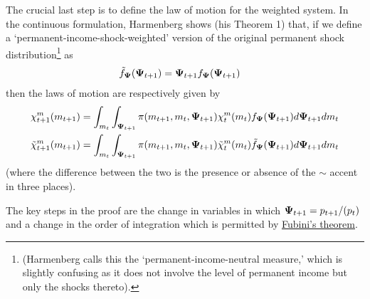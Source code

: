 \documentclass[\econtexRoot/BufferStockTheory]{subfiles}
\begin{document}
The crucial last step is to define the law of motion for the weighted system.  In the continuous formulation, Harmenberg shows (his Theorem 1) that, if we define a `permanent-income-shock-weighted' version of the original permanent shock distribution\footnote{(Harmenberg calls this the `permanent-income-neutral measure,' which is slightly confusing as it does not involve the level of permanent income but only the shocks thereto).} as
\begin{equation}\begin{gathered}\begin{aligned}
  \tilde{f}_{\mathbf{\Psi}}(\mathbf{\Psi}_{t+1}) & = \mathbf{\Psi}_{t+1} f_{\mathbf{\Psi}}(\mathbf{\Psi}_{t+1})
\end{aligned}\end{gathered}\end{equation}
then the laws of motion are respectively given by 
\begin{equation}\begin{aligned}
  {\chi}^{m}_{t+1}(m_{t+1}) & = \int_{m_{t}} \int_{\mathbf{\Psi}_{t+1}} \pi(m_{t+1},m_{t},\mathbf{\Psi}_{t+1}) {\chi}^{m}_{t}(m_{t}) f_{\mathbf{\Psi}}(\mathbf{\Psi}_{t+1}) d \mathbf{\Psi}_{t+1} d m_{t}
  \\
  \tilde{\chi}^{m}_{t+1}(m_{t+1}) & = \int_{m_{t}} \int_{\mathbf{\Psi}_{t+1}} \pi(m_{t+1},m_{t},\mathbf{\Psi}_{t+1}) \tilde{\chi}^{m}_{t}(m_{t}) \tilde{f}_{\mathbf{\Psi}}(\mathbf{\Psi}_{t+1}) d \mathbf{\Psi}_{t+1} d m_{t}
\end{aligned}\end{equation}
(where the difference between the two is the presence or absence of the $\sim$ accent in three places).

The key steps in the proof are the change in variables in which $\mathbf{\Psi}_{t+1}=p_{t+1}/( p_{t})$ and a change in the order of integration which is permitted by \href{https://en.wikipedia.org/wiki/Fubini\%27s_theorem}{Fubini's theorem}.
\end{document}
